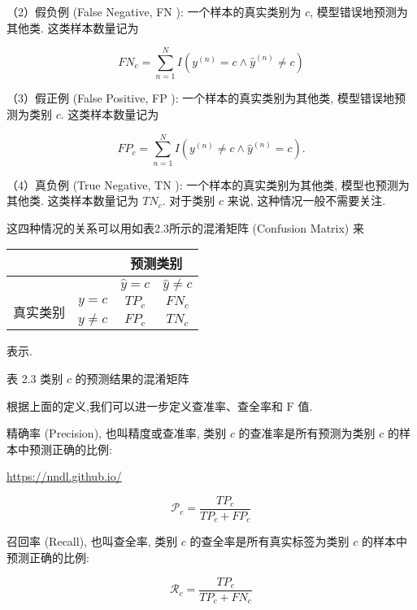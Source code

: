\documentclass[10pt]{article}
\begin{document}
（2）假负例 (False Negative, FN ): 一个样本的真实类别为 $c$, 模型错误地预测为其他类. 这类样本数量记为


\begin{equation*}
F N_{c}=\sum_{n=1}^{N} I\left(y^{(n)}=c \wedge \hat{y}^{(n)} \neq c\right) \tag{2.77}
\end{equation*}


（3）假正例 (False Positive, FP ): 一个样本的真实类别为其他类, 模型错误地预测为类别 $c$. 这类样本数量记为


\begin{equation*}
F P_{c}=\sum_{n=1}^{N} I\left(y^{(n)} \neq c \wedge \hat{y}^{(n)}=c\right) . \tag{2.78}
\end{equation*}


（4）真负例 (True Negative, TN ): 一个样本的真实类别为其他类, 模型也预测为其他类. 这类样本数量记为 $T N_{c}$. 对于类别 $c$ 来说, 这种情况一般不需要关注.

这四种情况的关系可以用如表2.3所示的混淆矩阵 (Confusion Matrix) 来

\begin{center}
\begin{tabular}{|c|c|c|c|}
\hline
 &  & \multicolumn{2}{|c|}{预测类别} \\
\hline
 &  & $\hat{y}=c$ & $\hat{y} \neq c$ \\
\hline
\multirow{2}{*}{真实类别} & $y=c$ & $T P_{c}$ & $F N_{c}$ \\
\hline
 & $y \neq c$ & $F P_{c}$ & $T N_{c}$ \\
\hline
\end{tabular}
\end{center}

表示.

表 2.3 类别 $c$ 的预测结果的混淆矩阵

根据上面的定义,我们可以进一步定义查准率、查全率和 $\mathrm{F}$ 值.

精确率 (Precision), 也叫精度或查准率, 类别 $c$ 的查准率是所有预测为类别 $c$ 的样本中预测正确的比例:

\href{https://nndl.github.io/}{https://nndl.github.io/}


\begin{equation*}
\mathcal{P}_{c}=\frac{T P_{c}}{T P_{c}+F P_{c}} \tag{2.79}
\end{equation*}


召回率 (Recall), 也叫查全率, 类别 $c$ 的查全率是所有真实标签为类别 $c$ 的样本中预测正确的比例:


\begin{equation*}
\mathcal{R}_{c}=\frac{T P_{c}}{T P_{c}+F N_{c}} \tag{2.80}
\end{equation*}
\end{document}
